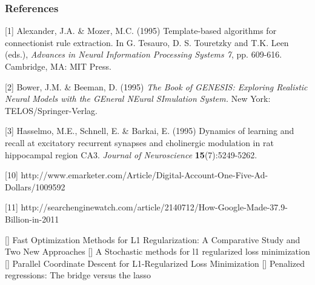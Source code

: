 \documentclass{article} %
\begin{document}
\subsubsection*{References}

\small{
[1] Alexander, J.A. \& Mozer, M.C. (1995) Template-based algorithms
for connectionist rule extraction. In G. Tesauro, D. S. Touretzky
and T.K. Leen (eds.), {\it Advances in Neural Information Processing
Systems 7}, pp. 609-616. Cambridge, MA: MIT Press.

[2] Bower, J.M. \& Beeman, D. (1995) {\it The Book of GENESIS: Exploring
Realistic Neural Models with the GEneral NEural SImulation System.}
New York: TELOS/Springer-Verlag.

[3] Hasselmo, M.E., Schnell, E. \& Barkai, E. (1995) Dynamics of learning
and recall at excitatory recurrent synapses and cholinergic modulation
in rat hippocampal region CA3. {\it Journal of Neuroscience}
{\bf 15}(7):5249-5262.

[10] http://www.emarketer.com/Article/Digital-Account-One-Five-Ad-Dollars/1009592

[11] http://searchenginewatch.com/article/2140712/How-Google-Made-37.9-Billion-in-2011

[] Fast Optimization Methods for L1 Regularization: A Comparative Study and Two New Approaches
[] A Stochastic methods for l1 regularized loss minimization
[] Parallel Coordinate Descent for L1-Regularized Loss Minimization
[] Penalized regressions: The bridge versus the lasso
}
\end{document}
